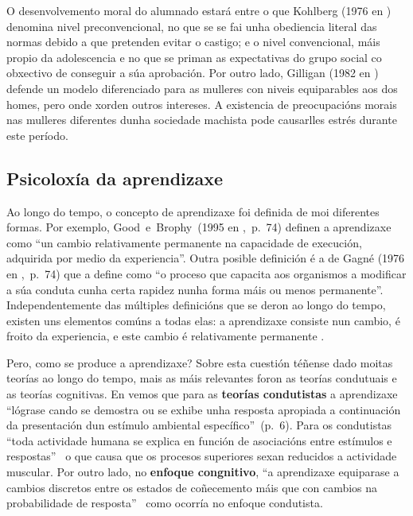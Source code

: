 
O desenvolvemento moral do alumnado estará entre o que Kohlberg (1976 en ) denomina nivel preconvencional, no que se se fai unha obediencia literal das normas debido a que pretenden evitar o castigo; e o nivel convencional, máis propio da adolescencia e no que se priman as expectativas do grupo social co obxectivo de conseguir a súa aprobación. Por outro lado, Gilligan (1982 en ) defende un modelo diferenciado para as mulleres con niveis equiparables aos dos homes, pero onde xorden outros intereses. A existencia de preocupacións morais nas mulleres diferentes dunha sociedade machista pode causarlles estrés durante este período.

\subsection{Psicoloxía da aprendizaxe}
Ao longo do tempo, o concepto de aprendizaxe foi definida de moi diferentes formas. Por exemplo, Good~e~Brophy~(1995 en ,~p.~74) definen a aprendizaxe como ``un cambio relativamente permanente na capacidade de execución, adquirida por medio da experiencia''. Outra posible definición é a de Gagné (1976 en ,~p.~74) que a define como ``o proceso que capacita aos organismos a modificar a súa conduta cunha certa rapidez nunha forma máis ou menos permanente''. Independentemente das múltiples definicións que se deron ao longo do tempo, existen uns elementos comúns a todas elas: a aprendizaxe consiste nun cambio, é froito da experiencia, e este cambio é relativamente permanente \cite{unedpsicoedu}.

Pero, como se produce a aprendizaxe? Sobre esta cuestión téñense dado moitas teorías ao longo do tempo, mais as máis relevantes foron as teorías condutuais e as teorías cognitivas. En  vemos que para as \textbf{teorías condutistas} a aprendizaxe ``lógrase cando se demostra ou se exhibe unha resposta apropiada a continuación da presentación dun estímulo ambiental específico''~(p.~6). Para os condutistas ``toda actividade humana se explica en función de asociacións entre estímulos e respostas''~\cite[p.~82]{unedpsicoedu} o que causa que os procesos superiores sexan reducidos a actividade muscular. Por outro lado, no \textbf{enfoque congnitivo}, ``a aprendizaxe equiparase a cambios discretos entre os estados de coñecemento máis que con cambios na probabilidade de resposta''~\cite[p.~9]{ertmer1993conductismo} como ocorría no enfoque condutista.

